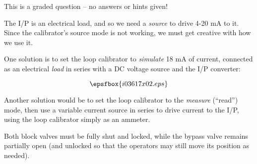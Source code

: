 This is a graded question -- no answers or hints given!







The I/P is an electrical load, and so we need a {\it source} to drive 4-20 mA to it.  Since the calibrator's source mode is not working, we must get creative with how we use it. 

One solution is to set the loop calibrator to {\it simulate} 18 mA of current, connected as an electrical {\it load} in series with a DC voltage source and the I/P converter:

$$\epsfbox{i03617x02.eps}$$

Another solution would be to set the loop calibrator to the {\it measure} (``read'') mode, then use a variable current source in series to drive current to the I/P, using the loop calibrator simply as an ammeter.

\vskip 10pt

Both block valves must be fully shut and locked, while the bypass valve remains partially open (and unlocked so that the operators may still move its position as needed).




